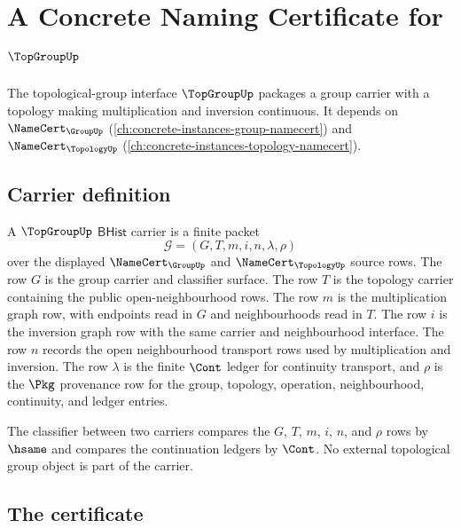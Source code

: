 \chapter{A Concrete Naming Certificate for $\TopGroupUp$}
\label{ch:concrete-instances-topgroup-namecert}

The topological-group interface $\TopGroupUp$ packages a group carrier with a topology making multiplication and inversion continuous. It depends on $\NameCert_{\GroupUp}$ (\autoref{ch:concrete-instances-group-namecert}) and $\NameCert_{\TopologyUp}$ (\autoref{ch:concrete-instances-topology-namecert}).

\section{Carrier definition}
\label{sec:topgroup-carrier}

\begin{definition}
\label{def:topgroup-bhist-carrier}
A $\TopGroupUp$ $\mathsf{BHist}$ carrier is a finite packet
$$
\mathcal G=(G,T,m,i,n,\lambda,\rho)
$$
over the displayed $\NameCert_{\GroupUp}$ and $\NameCert_{\TopologyUp}$
source rows. The row $G$ is the group carrier and classifier surface. The row
$T$ is the topology carrier containing the public open-neighbourhood rows. The
row $m$ is the multiplication graph row, with endpoints read in $G$ and
neighbourhoods read in $T$. The row $i$ is the inversion graph row with the
same carrier and neighbourhood interface. The row $n$ records the open
neighbourhood transport rows used by multiplication and inversion. The row
$\lambda$ is the finite $\Cont$ ledger for continuity transport, and $\rho$ is
the $\Pkg$ provenance row for the group, topology, operation, neighbourhood,
continuity, and ledger entries.

The classifier between two carriers compares the $G$, $T$, $m$, $i$, $n$, and
$\rho$ rows by $\hsame$ and compares the continuation ledgers by $\Cont$. No
external topological group object is part of the carrier.
\end{definition}

\section{The certificate}
\label{sec:topgroup-certificate}

